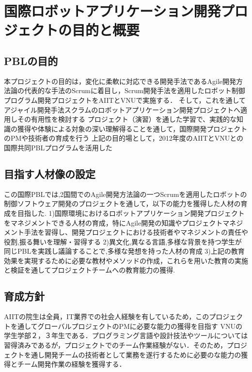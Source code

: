 \documentclass[paper]{jrsj}
\begin{document}
\section{国際ロボットアプリケーション開発プロジェクトの目的と概要}
\subsection{PBLの目的}
本プロジェクトの目的は，変化に柔軟に対応できる開発手法であるAgile開発方法論の代表的な手法のScrumに着目し，Scrum開発手法を適用したロボット制御プログラム開発プロジェクトをAIITとVNUで実施する．
そして，これを通して
アジャイル開発手法スクラムのロボットアプリケーション開発プロジェクトへ適用しその有用性を検討する
プロジェクト（演習）を通した学習で、実践的な知識の獲得や体験による対象の深い理解得ることを通して，国際開発プロジェクトのPMや技術者の育成を行う
上記の目的場として，2012年度のAIITとVNUとの国際共同PBLプログラムを活用した

\subsection{目指す人材像の設定}
この国際PBLでは,2国間でのAgile開発方法論の一つScrumを適用したロボットの制御ソフトウェア開発のプロジェクトを通して，以下の能力を獲得した人材の育成を目指した.
1)国際環境におけるロボットアプリケーション開発プロジェクトをマネジメントできる人材の育成，特にAgile開発の知識やプロジェクトマネジメント手法を習得し、開発プロジェクトにおける技術者やマネジメントの責任や役割,振る舞いを理解・習得する
2)異文化,異なる言語,多様な背景を持つ学生が同じPBLを実践し議論することで,多様な発想を持った人材の育成
3)上記の教育効果を実現するために必要な教材やメソッドの作成，これらを用いた教育の実施と検証を通してプロジェクトチームへの教育能力の獲得.
\subsection{育成方針}
AIITの院生は全員，IT業界での社会人経験を有しているため，このプロジェクトを通してグローバルプロジェクトのPMに必要な能力の獲得を目指す
VNUの学生学部２，３年生である．プログラミング言語や設計技法やツールについては習得済みであるが，プロジェクトでのチーム作業経験がない．そのため，プロジェクトを通し開発チームの技術者として業務を遂行するために必要のな能力の獲得とチーム開発作業の経験を獲得する．
\end{document}
